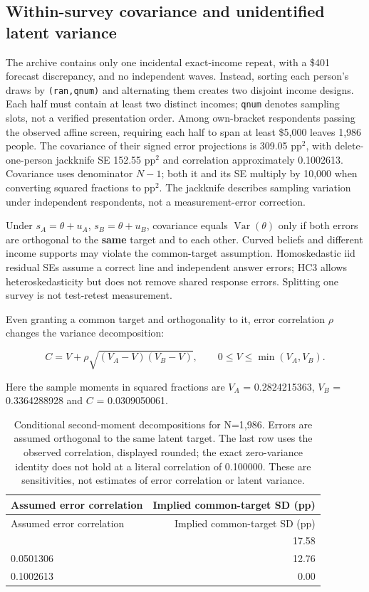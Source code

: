 \documentclass[
  11pt,
  letterpaper,
  DIV=11,
  numbers=noendperiod]{scrartcl}
\begin{document}
\subsection{Within-survey covariance and unidentified latent
variance}\label{within-survey-covariance-and-unidentified-latent-variance}

The archive contains only one incidental exact-income repeat, with a
\$401 forecast discrepancy, and no independent waves. Instead, sorting
each person's draws by \texttt{(ran,qnum)} and alternating them creates
two disjoint income designs. Each half must contain at least two
distinct incomes; \texttt{qnum} denotes sampling slots, not a verified
presentation order. Among own-bracket respondents passing the observed
affine screen, requiring each half to span at least \$5,000 leaves 1,986
people. The covariance of their signed error projections is 309.05
pp\(^2\), with delete-one-person jackknife SE 152.55 pp\(^2\) and
correlation approximately 0.1002613. Covariance uses denominator
\(N-1\); both it and its SE multiply by 10,000 when converting squared
fractions to pp\(^2\). The jackknife describes sampling variation under
independent respondents, not a measurement-error correction.

Under \(s_A=\theta+u_A\), \(s_B=\theta+u_B\), covariance equals
\(\operatorname{Var}(\theta)\) only if both errors are orthogonal to the
\textbf{same} target and to each other. Curved beliefs and different
income supports may violate the common-target assumption. Homoskedastic
iid residual SEs assume a correct line and independent answer errors;
HC3 allows heteroskedasticity but does not remove shared response
errors. Splitting one survey is not test-retest measurement.

Even granting a common target and orthogonality to it, error correlation
\(\rho\) changes the variance decomposition:

\[C=V+\rho\sqrt{(V_A-V)(V_B-V)},\qquad 0\leq V\leq\min(V_A,V_B).\]

Here the sample moments in squared fractions are \(V_A\) = 0.2824215363,
\(V_B\) = 0.3364288928 and \(C\) = 0.0309050061.

\begin{longtable}[]{@{}lr@{}}
\caption{Conditional second-moment decompositions for N=1,986. Errors
are assumed orthogonal to the same latent target. The last row uses the
observed correlation, displayed rounded; the exact zero-variance
identity does not hold at a literal correlation of 0.100000. These are
sensitivities, not estimates of error correlation or latent
variance.}\label{tbl-study1-covariance}\tabularnewline
\toprule\noalign{}
Assumed error correlation & Implied common-target SD (pp) \\
\midrule\noalign{}
\endfirsthead
\toprule\noalign{}
Assumed error correlation & Implied common-target SD (pp) \\
\midrule\noalign{}
\endhead
\bottomrule\noalign{}
\endlastfoot
0.0000000 & 17.58 \\
0.0501306 & 12.76 \\
0.1002613 & 0.00 \\
\end{longtable}
\end{document}
